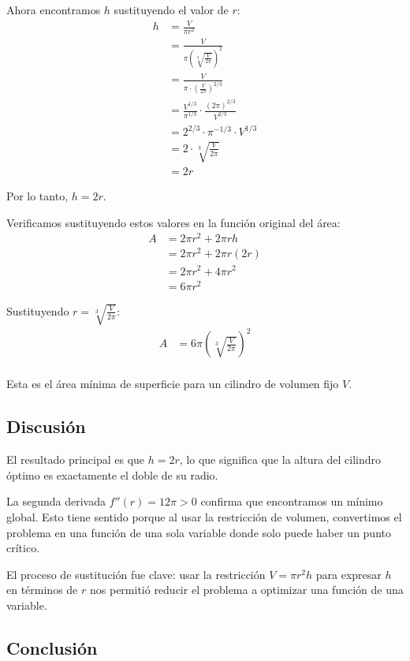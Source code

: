 \documentclass{article}
\begin{document}
Ahora encontramos $h$ sustituyendo el valor de $r$:
\begin{align}
h &= \frac{V}{\pi r^2} \\
&= \frac{V}{\pi \left(\sqrt[3]{\frac{V}{2\pi}}\right)^2} \\
&= \frac{V}{\pi \cdot \left(\frac{V}{2\pi}\right)^{2/3}} \\
&= \frac{V^{1/3}}{\pi^{1/3}} \cdot \frac{(2\pi)^{2/3}}{V^{2/3}} \\
&= 2^{2/3} \cdot \pi^{-1/3} \cdot V^{1/3} \\
&= 2 \cdot \sqrt[3]{\frac{V}{2\pi}} \\
&= 2r
\end{align}

Por lo tanto, $h = 2r$.

Verificamos sustituyendo estos valores en la función original del área:
\begin{align}
A &= 2\pi r^2 + 2\pi rh \\
&= 2\pi r^2 + 2\pi r(2r) \\
&= 2\pi r^2 + 4\pi r^2 \\
&= 6\pi r^2
\end{align}

Sustituyendo $r = \sqrt[3]{\frac{V}{2\pi}}$:
\begin{align}
A &= 6\pi \left(\sqrt[3]{\frac{V}{2\pi}}\right)^2 \\
\end{align}

Esta es el área mínima de superficie para un cilindro de volumen fijo $V$.

\subsection{Discusión}

El resultado principal es que $h = 2r$, lo que significa que la altura del cilindro óptimo es exactamente el doble de su radio. 

La segunda derivada $f''(r) = 12\pi > 0$ confirma que encontramos un mínimo global. Esto tiene sentido porque al usar la restricción de volumen, convertimos el problema en una función de una sola variable donde solo puede haber un punto crítico.

El proceso de sustitución fue clave: usar la restricción $V = \pi r^2 h$ para expresar $h$ en términos de $r$ nos permitió reducir el problema a optimizar una función de una variable.

\subsection{Conclusión}
\end{document}
